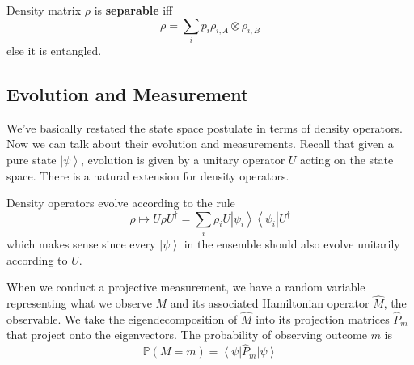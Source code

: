 \documentclass{article}
\newcommand{\ket}[1]{\ensuremath{\left|#1\right\rangle}}
\newcommand{\bra}[1]{\ensuremath{\left\langle#1\right|}}
\begin{document}
      \begin{definition}[Separable]
        Density matrix $\rho$ is \textbf{separable} iff
        \begin{equation}
          \rho = \sum_i p_i \rho_{i, A} \otimes \rho_{i, B}
        \end{equation}
        else it is entangled. 
      \end{definition}

  \subsection{Evolution and Measurement}

    We've basically restated the state space postulate in terms of density operators. Now we can talk about their evolution and measurements. Recall that given a pure state $\ket{\psi}$, evolution is given by a unitary operator $U$ acting on the state space. There is a natural extension for density operators. 

    \begin{lemma}
      Density operators evolve according to the rule 
      \begin{equation} 
        \rho \mapsto U \rho U^\dagger = \sum_i \rho_i U \ket{\psi_i} \bra{\psi_i} U^\dagger
      \end{equation}
      which makes sense since every $\ket{\psi}$ in the ensemble should also evolve unitarily according to $U$. 
    \end{lemma}

    When we conduct a projective measurement, we have a random variable representing what we observe $M$ and its associated Hamiltonian operator $\hat{M}$, the observable. We take the eigendecomposition of $\hat{M}$ into its projection matrices $\hat{P}_m$ that project onto the eigenvectors. The probability of observing outcome $m$ is 
    \begin{equation}
      \mathbb{P}(M = m) = \bra{\psi} \hat{P}_m \ket{\psi} 
    \end{equation}
\end{document}
